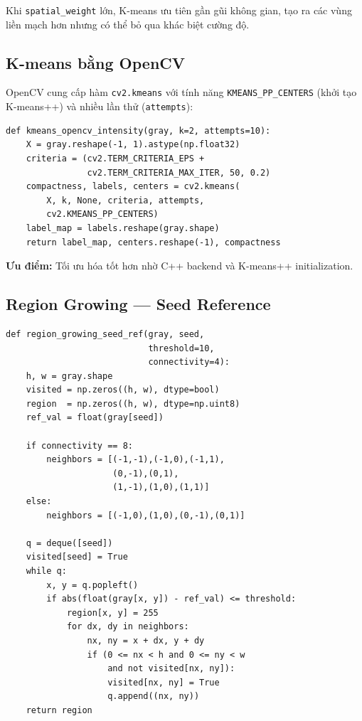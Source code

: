 \documentclass[12pt,a4paper]{article}
\begin{document}
Khi \texttt{spatial\_weight} lớn, K-means ưu tiên gần gũi không gian, tạo ra các vùng liền mạch hơn nhưng có thể bỏ qua khác biệt cường độ.

\subsection{K-means bằng OpenCV}

OpenCV cung cấp hàm \texttt{cv2.kmeans} với tính năng \texttt{KMEANS\_PP\_CENTERS} (khởi tạo K-means++) và nhiều lần thử (\texttt{attempts}):

\begin{lstlisting}
def kmeans_opencv_intensity(gray, k=2, attempts=10):
    X = gray.reshape(-1, 1).astype(np.float32)
    criteria = (cv2.TERM_CRITERIA_EPS +
                cv2.TERM_CRITERIA_MAX_ITER, 50, 0.2)
    compactness, labels, centers = cv2.kmeans(
        X, k, None, criteria, attempts,
        cv2.KMEANS_PP_CENTERS)
    label_map = labels.reshape(gray.shape)
    return label_map, centers.reshape(-1), compactness
\end{lstlisting}

\textbf{Ưu điểm:} Tối ưu hóa tốt hơn nhờ C++ backend và K-means++ initialization.

\subsection{Region Growing --- Seed Reference}

\begin{lstlisting}
def region_growing_seed_ref(gray, seed,
                            threshold=10,
                            connectivity=4):
    h, w = gray.shape
    visited = np.zeros((h, w), dtype=bool)
    region  = np.zeros((h, w), dtype=np.uint8)
    ref_val = float(gray[seed])

    if connectivity == 8:
        neighbors = [(-1,-1),(-1,0),(-1,1),
                     (0,-1),(0,1),
                     (1,-1),(1,0),(1,1)]
    else:
        neighbors = [(-1,0),(1,0),(0,-1),(0,1)]

    q = deque([seed])
    visited[seed] = True
    while q:
        x, y = q.popleft()
        if abs(float(gray[x, y]) - ref_val) <= threshold:
            region[x, y] = 255
            for dx, dy in neighbors:
                nx, ny = x + dx, y + dy
                if (0 <= nx < h and 0 <= ny < w
                    and not visited[nx, ny]):
                    visited[nx, ny] = True
                    q.append((nx, ny))
    return region
\end{lstlisting}
\end{document}
